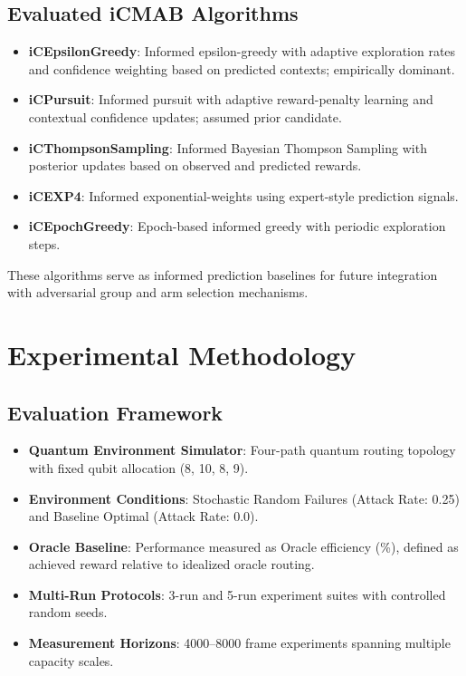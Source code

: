 \documentclass[12pt,a4paper]{article}
\begin{document}
\subsection{Evaluated iCMAB Algorithms}
\begin{itemize}
\item \textbf{iCEpsilonGreedy}: Informed epsilon-greedy with adaptive exploration rates and confidence weighting based on predicted contexts; empirically dominant.
\item \textbf{iCPursuit}: Informed pursuit with adaptive reward-penalty learning and contextual confidence updates; assumed prior candidate.
\item \textbf{iCThompsonSampling}: Informed Bayesian Thompson Sampling with posterior updates based on observed and predicted rewards.
\item \textbf{iCEXP4}: Informed exponential-weights using expert-style prediction signals.
\item \textbf{iCEpochGreedy}: Epoch-based informed greedy with periodic exploration steps.
\end{itemize}

These algorithms serve as informed prediction baselines for future integration with adversarial group and arm selection mechanisms.

\section{Experimental Methodology}

\subsection{Evaluation Framework}
\begin{itemize}
\item \textbf{Quantum Environment Simulator}: Four-path quantum routing topology with fixed qubit allocation (8, 10, 8, 9).
\item \textbf{Environment Conditions}: Stochastic Random Failures (Attack Rate: 0.25) and Baseline Optimal (Attack Rate: 0.0).
\item \textbf{Oracle Baseline}: Performance measured as Oracle efficiency (\%), defined as achieved reward relative to idealized oracle routing.
\item \textbf{Multi-Run Protocols}: 3-run and 5-run experiment suites with controlled random seeds.
\item \textbf{Measurement Horizons}: 4000--8000 frame experiments spanning multiple capacity scales.
\end{itemize}
\end{document}
